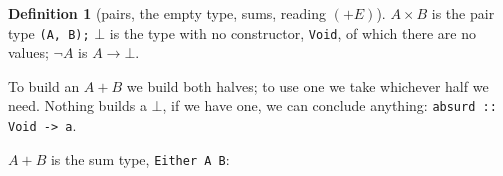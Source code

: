 \documentclass[a4paper, 11pt]{article}
\theoremstyle{definition}
\newtheorem{definition}{Definition}[section]
\begin{document}
\begin{definition}[pairs, the empty type, sums, reading $(+E)$]
    $A \times B$ is the pair type \texttt{(A, B);} $\bot$ is the type with no constructor, \texttt{Void}, of which
    there are no values; $\neg A$ is $A \to \bot$.
    \begin{prooftree}
    \end{prooftree}

    \begin{prooftree}
    \end{prooftree}

    \begin{prooftree}
    \end{prooftree}

    \begin{prooftree}
    \end{prooftree}
    To build an $A + B$ we build both halves; to use one we take whichever half we need. Nothing builds a $\bot$, if we
    have one, we can conclude anything: \texttt{absurd :: Void -> a}.

    $A + B$ is the sum type, \texttt{Either A B}:
    \begin{prooftree}
    \end{prooftree}

    \begin{prooftree}
    \end{prooftree}


\end{definition}
\end{document}
